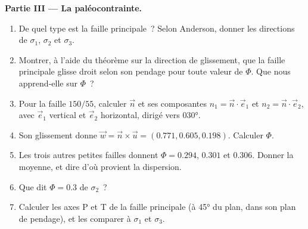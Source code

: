 \begin{problem}
\medskip\noindent\textbf{Partie III --- La paléocontrainte.}
\begin{enumerate}[resume]
  \item De quel type est la faille principale~? Selon Anderson, donner les
        directions de $\sigma_1$, $\sigma_2$ et $\sigma_3$.
  \item Montrer, à l'aide du théorème sur la direction de glissement, que la faille principale
        glisse droit selon son pendage pour toute valeur de $\Phi$. Que
        nous apprend-elle sur $\Phi$~?
  \item Pour la faille $150/55$, calculer $\vec n$ et ses composantes $n_1 =
        \vec n\cdot\vec e_1$ et $n_2 = \vec n\cdot\vec e_2$, avec $\vec e_1$
        vertical et $\vec e_2$ horizontal, dirigé vers \ang{030}.
  \item Son glissement donne $\vec w = \vec n\times\vec u = (0.771, 0.605, 0.198)$.
        Calculer $\Phi$.
  \item Les trois autres petites failles donnent $\Phi = 0.294$, $0.301$ et
        $0.306$. Donner la moyenne, et dire d'où provient la dispersion.
  \item Que dit $\Phi = 0.3$ de $\sigma_2$~?
  \item Calculer les axes P et T de la faille principale (à \ang{45} du
        plan, dans son plan de pendage), et les comparer à $\sigma_1$ et
        $\sigma_3$.
\end{enumerate}


\end{problem}
